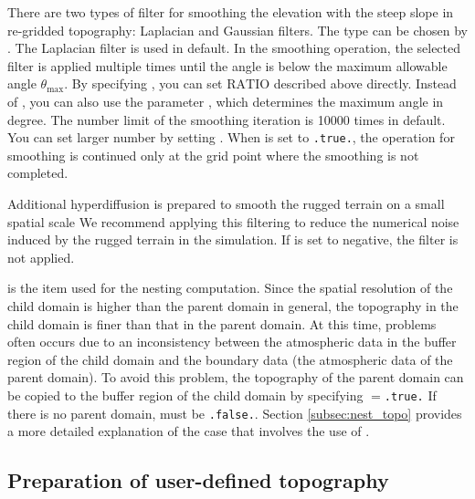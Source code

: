 There are two types of filter for smoothing the elevation with the steep slope in re-gridded topography: Laplacian and Gaussian filters.
The type can be chosen by . The Laplacian filter is used in default.
In the smoothing operation, the selected filter is applied multiple times until the angle is below the maximum allowable angle $\theta_{\max}$.
By specifying , you can set $\mathrm{RATIO}$ described above directly.
Instead of , you can also use the parameter , which determines the maximum angle in degree.
The number limit of the smoothing iteration is 10000 times in default. You can set larger number by setting .
When  is set to \verb|.true.|, the operation for smoothing is continued only at the grid point where the smoothing is not completed.

Additional hyperdiffusion is prepared to smooth the rugged terrain on a small spatial scale
We recommend applying this filtering to reduce the numerical noise induced by the rugged terrain in the simulation.
If  is set to negative, the filter is not applied.


 is the item used for the nesting computation.
Since the spatial resolution of the child domain is higher than the parent domain in general,
the topography in the child domain is finer than that in the parent domain.
At this time, problems often occurs due to an inconsistency between the atmospheric data in the buffer region of the child domain and the boundary data (the atmospheric data of the parent domain).
To avoid this problem, the topography of the parent domain can be copied to the buffer region of the child domain by specifying $=$\verb|.true.| If there is no parent domain,  must be \verb|.false.|. Section \ref{subsec:nest_topo} provides a more detailed explanation of the case that involves the use of .



\subsection{Preparation of user-defined topography} \label{subsec:topo_userfile}

